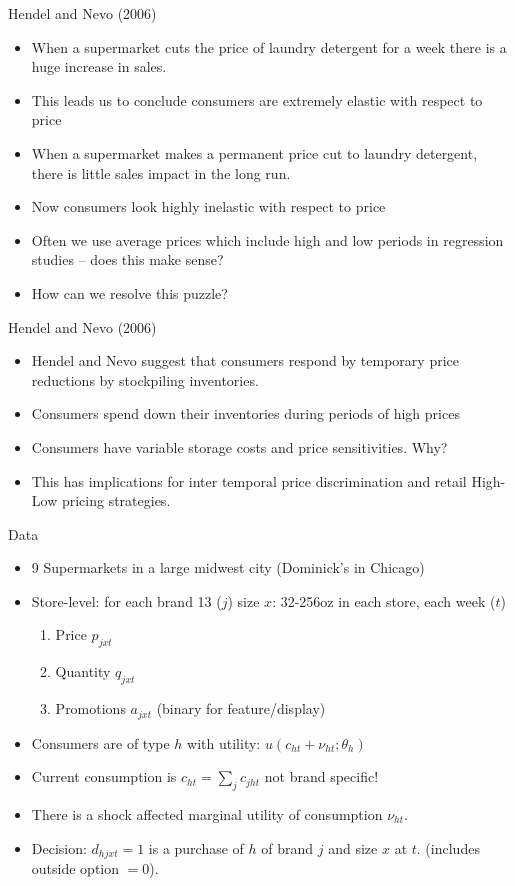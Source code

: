 \begin{frame}{Hendel and Nevo (2006)}
\begin{itemize}
\item When a supermarket cuts the price of laundry detergent for a week there is a huge increase in sales.
\item This leads us to conclude consumers are extremely elastic with respect to price
\item When a supermarket makes a permanent price cut to laundry detergent, there is little sales impact in the long run.
\item Now consumers look highly inelastic with respect to price
\item Often we use average prices which include high and low periods in regression studies -- does this make sense?
\item How can we resolve this puzzle?
\end{itemize}
\end{frame}

\begin{frame}{Hendel and Nevo (2006)}
\begin{itemize}
\item Hendel and Nevo suggest that consumers respond by temporary price  reductions by stockpiling inventories.
\item Consumers spend down their inventories during periods of high prices
\item Consumers have variable storage costs and price sensitivities. Why?
\item This has implications for inter temporal price discrimination and retail High-Low pricing strategies.
\end{itemize}
\end{frame}

\begin{frame}{Data}
\begin{itemize}
\item 9 Supermarkets in a large midwest city (Dominick's in Chicago)
\item Store-level: for each brand 13 ($j$) size $x$: 32-256oz in each store, each week ($t$)
\begin{enumerate}
\item Price $p_{jxt}$ 
\item Quantity $q_{jxt}$
\item Promotions $a_{jxt}$ (binary for feature/display)
\end{enumerate}
\item Consumers are of type $h$ with utility: $u(c_{ht} + \nu_{ht}; \theta_h)$
\item Current consumption is $c_{ht} = \sum_j c_{jht}$ \alert{not brand specific!}
\item There is a shock affected marginal utility of consumption $\nu_{ht}$.
\item Decision: $d_{hjxt} = 1$ is a purchase of $h$ of brand $j$ and size $x$ at $t$. (includes outside option $=0$).
\end{itemize}
\end{frame}

